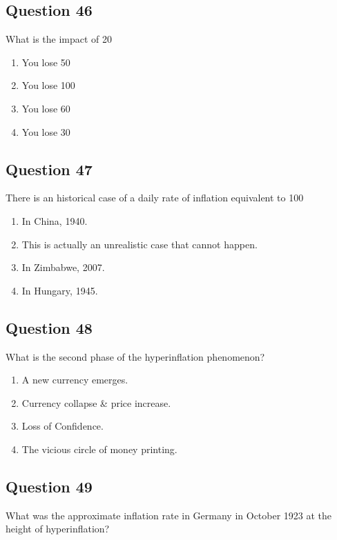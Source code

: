 \documentclass[12pt,a4paper]{article}
\begin{document}
\subsection*{Question 46}
What is the impact of 20%

\begin{enumerate}[label=\Alph*., leftmargin=*]
\item You lose 50%
\item You lose 100%
\item You lose 60%
\item You lose 30%
\end{enumerate}

\bigskip


\subsection*{Question 47}
There is an historical case of a daily rate of inflation equivalent to 100%

\begin{enumerate}[label=\Alph*., leftmargin=*]
\item In China, 1940.
\item This is actually an unrealistic case that cannot happen.
\item In Zimbabwe, 2007.
\item In Hungary, 1945.
\end{enumerate}

\bigskip


\subsection*{Question 48}
What is the second phase of the hyperinflation phenomenon?

\begin{enumerate}[label=\Alph*., leftmargin=*]
\item A new currency emerges.
\item Currency collapse & price increase.
\item Loss of Confidence.
\item The vicious circle of money printing.
\end{enumerate}

\bigskip


\subsection*{Question 49}
What was the approximate inflation rate in Germany in October 1923 at the height of hyperinflation?
\end{document}
